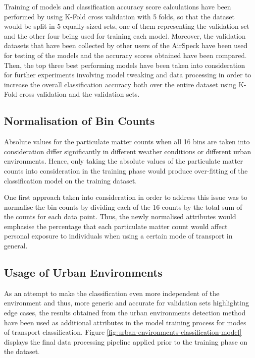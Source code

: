 \documentclass[bsc,frontabs,twoside,singlespacing, parskip,deptreport]{infthesis}     %
\begin{document}
Training of models and classification accuracy score calculations have been performed by using K-Fold cross validation with 5 folds, so that the dataset would be split in 5 equally-sized sets, one of them representing the validation set and the other four being used for training each model. Moreover, the validation datasets that have been collected by other users of the AirSpeck have been used for testing of the models and the accuracy scores obtained have been compared. Then, the top three best performing models have been taken into consideration for further experiments involving model tweaking and data processing in order to increase the overall classification accuracy both over the entire dataset using K-Fold cross validation and the validation sets.

\subsection{Normalisation of Bin Counts}
\label{subsec:bin-count-normalisation}

Absolute values for the particulate matter counts when all 16 bins are taken into consideration differ significantly in different weather conditions or different urban environments. Hence, only taking the absolute values of the particulate matter counts into consideration in the training phase would produce over-fitting of the classification model on the training dataset.

One first approach taken into consideration in order to address this issue was to normalise the bin counts by dividing each of the 16 counts by the total sum of the counts for each data point. Thus, the newly normalised attributes would emphasise the percentage that each particulate matter count would affect personal exposure to individuals when using a certain mode of transport in general.

\subsection{Usage of Urban Environments}

As an attempt to make the classification even more independent of the environment and thus, more generic and accurate for validation sets highlighting edge cases, the results obtained from the urban environments detection method have been used as additional attributes in the model training process for modes of transport classification. Figure \ref{fig:urban-environments-classification-model} displays the final data processing pipeline applied prior to the training phase on the dataset.
\end{document}
